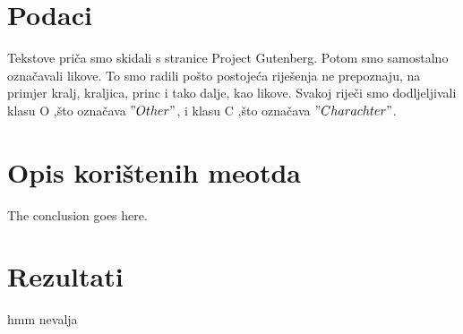 \documentclass[conference]{IEEEtran}
\begin{document}
\section{Podaci}
Tekstove pri\v{c}a smo skidali s stranice Project Gutenberg. Potom smo samostalno ozna\v{c}avali likove. To smo radili po\v{s}to postoje\'ca rije\v{s}enja ne prepoznaju, na primjer kralj, kraljica, princ i tako dalje, kao likove. Svakoj rije\v{c}i smo dodljeljivali klasu O ,\v{s}to ozna\v{c}ava $"Other"$, i klasu C ,\v{s}to ozna\v{c}ava $"Charachter"$.

\section{Opis kori\v{s}tenih meotda}
The conclusion goes here.

\section{Rezultati}
hmm nevalja 





\end{document}
